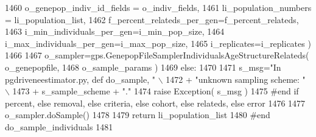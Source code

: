 \begin{DoxyCode}
1460                                         o\_genepop\_indiv\_id\_fields = o\_indiv\_fields,
1461                                         li\_population\_numbers = li\_population\_list,
1462                                         f\_percent\_relateds\_per\_gen=f\_percent\_relateds,
1463                                         i\_min\_individuals\_per\_gen=i\_min\_pop\_size,
1464                                         i\_max\_individuals\_per\_gen=i\_max\_pop\_size,
1465                                         i\_replicates=i\_replicates )
1466 
1467             o\_sampler=gps.GenepopFileSamplerIndividualsAgeStructureRelateds( o\_genepopfile,
1468                                                                     o\_sample\_params )
1469     \textcolor{keywordflow}{else}:
1470 
1471         s\_msg=\textcolor{stringliteral}{"In pgdriveneestimator.py, def do\_sample, "} \(\backslash\)
1472                 + \textcolor{stringliteral}{"unknown sampling scheme: "} \(\backslash\)
1473                 + s\_sample\_scheme + \textcolor{stringliteral}{"."}
1474         \textcolor{keywordflow}{raise} Exception( s\_msg )
1475     \textcolor{comment}{#end if percent, else removal, else criteria, else cohort, else relateds, else error}
1476 
1477     o\_sampler.doSample()
1478 
1479     \textcolor{keywordflow}{return} li\_population\_list
1480 \textcolor{comment}{#end do\_sample\_individuals}
1481 
\end{DoxyCode}
